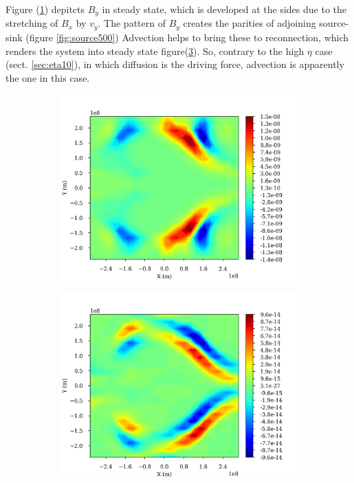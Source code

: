 \documentclass[11pt]{article}
\begin{document}
Figure (\ref{fig:By}) depitcts $B_y$ in steady state, which is developed at the sides due to the stretching of $B_x$ by $v_y$. The pattern of $B_y$ creates the parities of adjoining source-sink (figure \ref{fig:source500}) Advection helps to bring these to reconnection, which renders the system into steady state figure(\ref{fig:advect}). So, contrary to the high $\eta$ case (sect. \ref{sec:eta10}), in which diffusion is the driving force, advection is apparently the one in this case.
\begin{figure}
\begin{subfigure}{0.49\textwidth}
	\centering
	\includegraphics[width=\linewidth]{images/by_05e7_500.png}
	\caption{}
	\label{fig:By}
\end{subfigure}
\begin{subfigure}{0.49\textwidth}
	\centering
	\includegraphics[width=\linewidth]{images/advect_aver_500.png}
	\caption{}
	\label{fig:advect}
\end{subfigure}


\end{figure}
\end{document}

